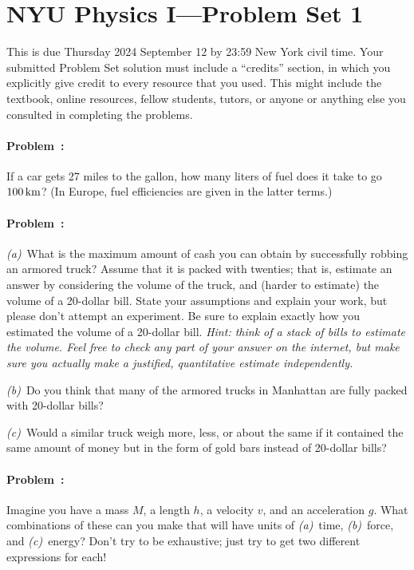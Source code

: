 \documentclass[12pt]{article}
\begin{document}
\section*{NYU Physics I---Problem Set 1}

This is due Thursday 2024 September 12 by 23:59 New York civil time.
Your submitted Problem Set solution must include a ``credits''
section, in which you explicitly give credit to every resource that
you used.  This might include the textbook, online resources, fellow
students, tutors, or anyone or anything else you consulted in completing the
problems.

\paragraph{Problem~\theproblem:}%
If a car gets 27 miles to the gallon, how many liters of fuel does it
take to go $100\,\mathrm{km}$? (In Europe, fuel efficiencies are given in the
latter terms.)

\paragraph{Problem~\theproblem:}%
\textsl{(a)}~What is the maximum amount of cash you can obtain by
successfully robbing an armored truck?  Assume that it is packed with
twenties; that is, estimate an answer by considering the volume of the
truck, and (harder to estimate) the volume of a 20-dollar bill.  State
your assumptions and explain your work, but please don't attempt an
experiment.  Be sure to explain exactly how you estimated the volume
of a 20-dollar bill.  \emph{Hint: think of a stack of bills to
  estimate the volume.  Feel free to \emph{check} any part of your
  answer on the internet, but make sure you actually make a justified,
  quantitative estimate independently.}

\textsl{(b)}~Do you think that many of the armored trucks in Manhattan
are fully packed with 20-dollar bills?

\textsl{(c)}~Would a similar truck weigh more, less, or about the same
if it contained the same amount of money but in the form of gold bars
instead of 20-dollar bills?

\paragraph{Problem~\theproblem:}%
Imagine you have a mass $M$, a length $h$, a velocity $v$, and an
acceleration $g$. What combinations of these can you make that will
have units of
\textsl{(a)}~time,
\textsl{(b)}~force, and
\textsl{(c)}~energy?
Don't try to be exhaustive; just try to get two different expressions
for each!
\end{document}
